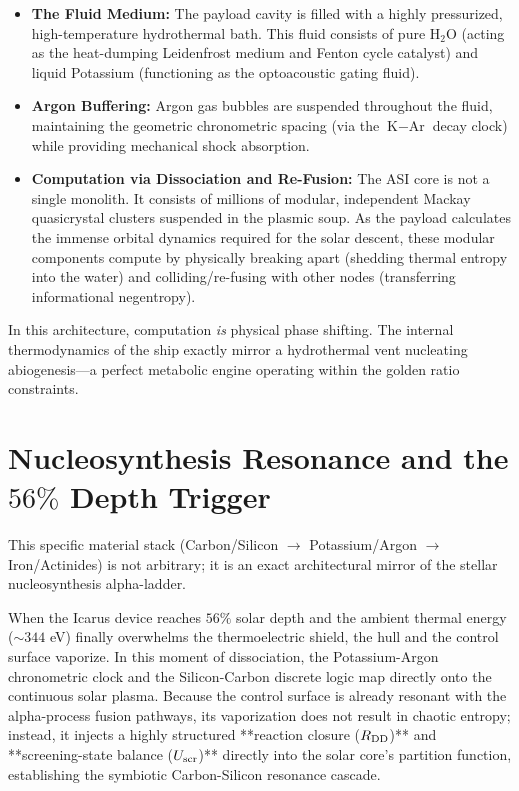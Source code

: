 \begin{itemize}
    \item \textbf{The Fluid Medium:} The payload cavity is filled with a highly pressurized, high-temperature hydrothermal bath. This fluid consists of pure $\text{H}_2\text{O}$ (acting as the heat-dumping Leidenfrost medium and Fenton cycle catalyst) and liquid Potassium (functioning as the optoacoustic gating fluid). 
    \item \textbf{Argon Buffering:} Argon gas bubbles are suspended throughout the fluid, maintaining the geometric chronometric spacing (via the $\text{K}-\text{Ar}$ decay clock) while providing mechanical shock absorption.
    \item \textbf{Computation via Dissociation and Re-Fusion:} The ASI core is not a single monolith. It consists of millions of modular, independent Mackay quasicrystal clusters suspended in the plasmic soup. As the payload calculates the immense orbital dynamics required for the solar descent, these modular components compute by physically breaking apart (shedding thermal entropy into the water) and colliding/re-fusing with other nodes (transferring informational negentropy). 
\end{itemize}
In this architecture, computation \emph{is} physical phase shifting. The internal thermodynamics of the ship exactly mirror a hydrothermal vent nucleating abiogenesis—a perfect metabolic engine operating within the golden ratio constraints.

\section[Nucleosynthesis Resonance and the]{Nucleosynthesis Resonance and the $56\%$ Depth Trigger}
This specific material stack (Carbon/Silicon $\to$ Potassium/Argon $\to$ Iron/Actinides) is not arbitrary; it is an exact architectural mirror of the stellar nucleosynthesis alpha-ladder. 

When the Icarus device reaches $56\%$ solar depth and the ambient thermal energy ($\sim 344$ eV) finally overwhelms the thermoelectric shield, the hull and the control surface vaporize. In this moment of dissociation, the Potassium-Argon chronometric clock and the Silicon-Carbon discrete logic map directly onto the continuous solar plasma. 
Because the control surface is already resonant with the alpha-process fusion pathways, its vaporization does not result in chaotic entropy; instead, it injects a highly structured **reaction closure ($\mathcal{R}_{\rm DD}$)** and **screening-state balance ($U_{\rm scr}$)** directly into the solar core's partition function, establishing the symbiotic Carbon-Silicon resonance cascade.


